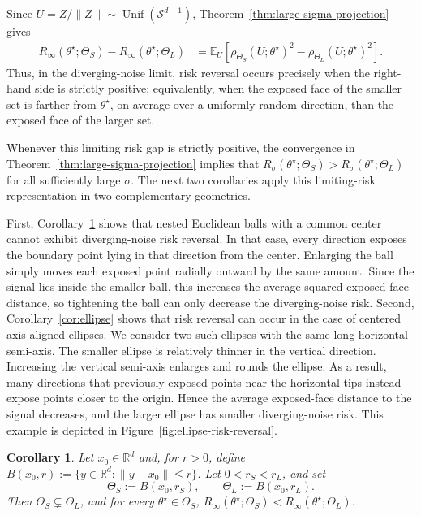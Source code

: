 \documentclass[11pt]{article}
\theoremstyle{plain}
\newtheorem{corollary}[theorem]{Corollary}
\theoremstyle{definition}
\providecommand{\mathbbm}{\mathbb} %
\newcommand{\R}{\mathbbm{R}}
\newcommand{\E}{\mathbb{E}}
\newcommand{\mcS}{\mathcal{S}}
\begin{document}
Since $U=Z/\|Z\|\sim\operatorname{Unif}(\mcS^{d-1})$,
Theorem~\ref{thm:large-sigma-projection} gives
\[
\begin{aligned}
    R_\infty(\theta^\star;\Theta_S)
    -
    R_\infty(\theta^\star;\Theta_L)
    &=
    \E_U\left[
        \rho_{\Theta_S}(U;\theta^\star)^2
        -
        \rho_{\Theta_L}(U;\theta^\star)^2
    \right].
\end{aligned}
\]
Thus, in the diverging-noise limit, risk reversal occurs precisely when the
right-hand side is strictly positive; equivalently, when the exposed face of
the smaller set is farther from $\theta^\star$, on average over a uniformly
random direction, than the exposed face of the larger set.


Whenever this limiting risk gap is strictly positive, the convergence in Theorem~\ref{thm:large-sigma-projection} implies that $R_\sigma(\theta^\star;\Theta_S)>R_\sigma(\theta^\star;\Theta_L)$ for all sufficiently large $\sigma$. The next two corollaries apply this limiting-risk representation in two complementary geometries.

First, Corollary~\ref{cor:balls} shows that nested Euclidean balls with a
common center cannot exhibit diverging-noise risk reversal. In that case, every
direction exposes the boundary point lying in that direction from the center.
Enlarging the ball simply moves each exposed point radially outward by the same
amount. Since the signal lies inside the smaller ball, this increases the
average squared exposed-face distance, so tightening the ball can only decrease
the diverging-noise risk. Second, Corollary~\ref{cor:ellipse} shows that risk reversal can occur in the case of centered axis-aligned ellipses. We consider two such ellipses with the same long horizontal semi-axis. The smaller ellipse is relatively thinner in the vertical direction. Increasing the vertical semi-axis enlarges and rounds the ellipse. As a result, many directions that previously exposed points near the horizontal tips instead expose points closer to the origin. Hence the average exposed-face distance to the signal decreases, and the larger ellipse has smaller diverging-noise risk. This example is depicted in Figure~\ref{fig:ellipse-risk-reversal}.


\begin{corollary}\label{cor:balls}
Let $x_0\in\R^d$ and, for $r>0$, define $B(x_0,r):=\{y\in\R^d:\|y-x_0\|\le r\}$. Let $0<r_S<r_L$, and set
\[
    \Theta_S:=B(x_0,r_S),
    \qquad
    \Theta_L:=B(x_0,r_L).
\]
Then $\Theta_S\subsetneq\Theta_L$, and for every
$\theta^\star\in\Theta_S$, $R_\infty(\theta^\star;\Theta_S) < R_\infty(\theta^\star;\Theta_L)$.
\end{corollary}
\end{document}
